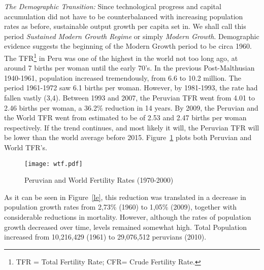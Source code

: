 \documentclass[12pt]{article}%
\begin{document}
\emph{The Demographic Transition:} Since technological progress and capital accumulation did not have to be counterbalanced with increasing population rates as before, sustainable output growth per capita set in. We shall call this period \emph{Sustained Modern Growth Regime} or simply \emph{Modern Growth}. Demographic evidence suggests the beginning of the Modern Growth period to be circa 1960. The TFR\footnote{TFR = Total Fertility Rate; CFR= Crude Fertility Rate.} in Peru was one of the highest in the world not too long ago, at around 7 births per woman until the early 70's. In the previous Post-Malthusian 1940-1961, population increased tremendously, from 6.6 to 10.2 million. The period 1961-1972 saw 6.1 births per woman. However, by 1981-1993, the rate had fallen vastly (3,4). Between 1993 and 2007, the Peruvian TFR went from 4.01 to 2.46 births per woman, a 36.2\% reduction in 14 years. By 2009, the Peruvian and the World TFR went from estimated to be of 2.53 and 2.47 births per woman respectively. If the trend continues, and most likely it will, the Peruvian TFR will be lower than the world average before 2015. Figure~\ref{pw} plots both Peruvian and World TFR's.
\begin{figure}[h]
\caption{Peruvian and World Fertility Rates (1970-2000)}
\centering
\texttt{[image: wtf.pdf]} \\
\label{pw}
\end{figure}
As it can be seen in Figure~\ref{le}, this reduction was translated in a decrease in population growth rates from 2,73\% (1960) to 1,05\% (2009), together with considerable reductions in mortality. However, although the rates of population growth decreased over time, levels remained somewhat high. Total Population increased from 10,216,429 (1961) to 29,076,512 peruvians (2010).
\end{document}
